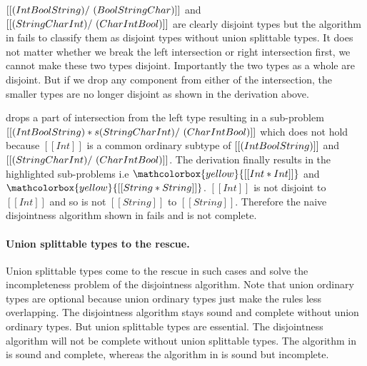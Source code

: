 




\noindent
$[[(Int \/ Bool \/ String) /\ (Bool \/ String \/ Char)]]$  and 
$[[(String \/ Char \/ Int) /\ (Char \/ Int \/ Bool)]]$
are clearly disjoint types but the algorithm in 
fails to classify them as disjoint types without union splittable types.
It does not matter whether we break the left intersection or right intersection
first, we cannot make these two types disjoint. Importantly the two types
as a whole are disjoint. But if we drop any component from either of the
intersection, the smaller types are no longer disjoint as shown in
the derivation above. 

 drops a part of intersection
from the left type resulting in a sub-problem 
$[[(Int\/Bool\/String) *s (String\/Char\/Int) /\ (Char\/Int\/Bool)]]$
which does not hold because $[[Int]]$ is a common ordinary subtype
of $[[(Int\/Bool\/String)]]$ and $[[(String\/Char\/Int) /\ (Char\/Int\/Bool)]]$.
The derivation finally results in the highlighted sub-problems
i.e $\mathcolorbox{yellow}{[[Int * Int]]}$ and 
$\mathcolorbox{yellow}{[[String * String]]}$. $[[Int]]$ is not
disjoint to $[[Int]]$ and so is not $[[String]]$ to $[[String]]$.
Therefore the naive disjointness algorithm shown 
in  fails and is not complete.

\paragraph{Union splittable types to the rescue.}
Union splittable types come to the rescue in such cases and
solve the incompleteness problem of the disjointness algorithm.
Note that union ordinary types are optional because union 
ordinary types just make the rules less overlapping.
The disjointness algorithm stays sound and complete without
union ordinary types. But union splittable types are essential.
The disjointness algorithm will not be complete without union 
splittable types. The algorithm in  
is sound and complete, whereas the algorithm in 
 is sound but incomplete.

